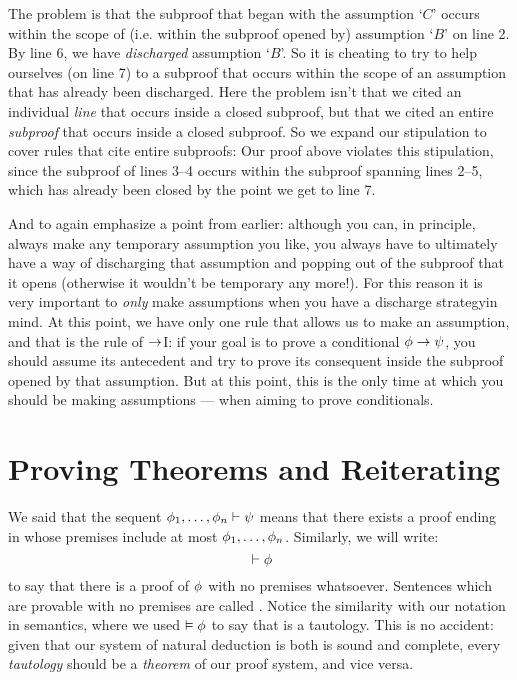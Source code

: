 The problem is that the subproof that began with the assumption `$C$' occurs within the scope of (i.e. within the subproof opened by) assumption `$B$' on line 2. By line 6, we have \emph{discharged} assumption `$B$'. So it is cheating to try to help ourselves (on line 7) to a subproof that occurs within the scope of an assumption that has already been discharged.  Here the problem isn't that we cited an individual \emph{line} that occurs inside a closed subproof, but that we cited an entire \emph{subproof} that occurs inside a closed subproof.  So we expand our stipulation to cover rules that cite entire subproofs:
Our proof above violates this stipulation, since the subproof of lines 3--4 occurs within the subproof spanning lines 2--5, which has already been closed by the point we get to line 7.


And to again emphasize a point from earlier: although you can, in principle, always make any temporary assumption you like, you always have to ultimately have a way of discharging that assumption and popping out of the subproof that it opens (otherwise it wouldn't be temporary any more!).    For this reason it is very important to \emph{only}  make assumptions when you have a discharge strategyin mind.  At this point, we have only one rule that allows us to make an assumption, and that is the rule of $\rightarrow$I: if your goal is to prove a conditional $\mathcal{\phi} \rightarrow \mathcal{\psi}$, you should assume its antecedent \meta{\phi} and try to prove its consequent \meta{\psi} inside the subproof opened by that assumption.  But at this point, this is the only time at which you should be making assumptions --- when aiming to prove conditionals.





\section{Proving Theorems and Reiterating}\label{s:TheoremsReiterating}

We said that the sequent $\mathcal{\phi}_1, \ldots, \mathcal{\phi}_n \vdash \mathcal{\psi}$ means that there exists a proof ending in \meta{\psi} whose premises include at most $\mathcal{\phi}_1, \ldots, \mathcal{\phi}_n$.  Similarly, we will write:
$${} \vdash \mathcal{\phi}$$
to say that there is a proof of $\mathcal{\phi}$ with no premises whatsoever.  Sentences which are provable with no premises are called .  Notice the similarity with our notation in semantics, where we used $\vDash \mathcal{\phi}$ to say that \meta{\phi} is a tautology.  This is no accident: given that our system of natural deduction is both is sound and complete, every \emph{tautology} should be a \emph{theorem} of our proof system, and vice versa.

